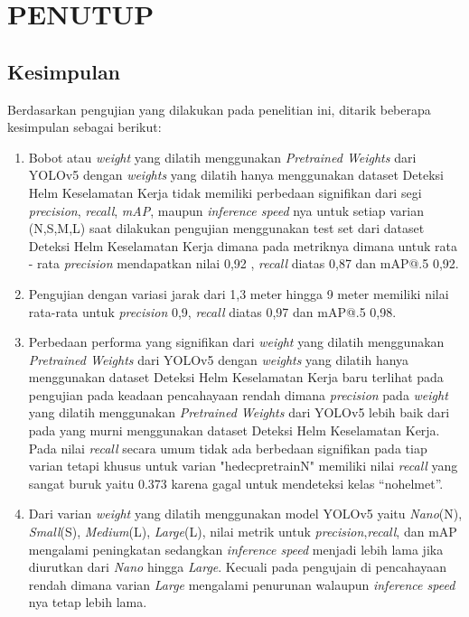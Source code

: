 \chapter{PENUTUP}
\label{chap:penutup}


\section{Kesimpulan}
\label{sec:kesimpulan}

\par Berdasarkan pengujian yang dilakukan pada penelitian ini, ditarik beberapa kesimpulan sebagai berikut:

\begin{enumerate}[nolistsep]
    \item Bobot atau \emph{weight} yang dilatih menggunakan \emph{Pretrained Weights} dari YOLOv5 dengan \emph{weights} yang dilatih hanya menggunakan dataset Deteksi Helm Keselamatan Kerja tidak memiliki perbedaan signifikan dari segi \emph{precision}, \emph{recall}, \emph{mAP}, maupun \emph{inference speed} nya untuk setiap varian (N,S,M,L) saat dilakukan pengujian menggunakan test set dari dataset Deteksi Helm Keselamatan Kerja dimana pada metriknya dimana untuk rata - rata \emph{precision} mendapatkan nilai 0,92 ,  \emph{recall} diatas 0,87 dan mAP@.5 0,92.
    \item Pengujian dengan variasi jarak dari 1,3 meter hingga 9 meter memiliki nilai rata-rata untuk \emph{precision} 0,9, \emph{recall} diatas 0,97 dan mAP@.5 0,98.
    \item Perbedaan performa yang signifikan dari \emph{weight} yang dilatih menggunakan \emph{Pretrained Weights} dari YOLOv5 dengan \emph{weights} yang dilatih hanya menggunakan dataset Deteksi Helm Keselamatan Kerja baru terlihat pada pengujian pada keadaan pencahayaan rendah dimana \emph{precision} pada \emph{weight} yang dilatih menggunakan \emph{Pretrained Weights} dari YOLOv5 lebih baik dari pada yang murni menggunakan dataset Deteksi Helm Keselamatan Kerja. Pada nilai \emph{recall} secara umum tidak ada berbedaan signifikan pada tiap varian tetapi khusus untuk varian "hedec\textunderscore pretrain\textunderscore N" memiliki nilai \emph{recall} yang sangat buruk yaitu 0.373 karena gagal untuk mendeteksi kelas “no\textunderscore helmet”.
    \item Dari varian \emph{weight} yang dilatih menggunakan model YOLOv5 yaitu \emph{Nano}(N), \emph{Small}(S), \emph{Medium}(L), \emph{Large}(L), nilai metrik untuk \emph{precision},\emph{recall}, dan mAP mengalami peningkatan sedangkan \emph{inference speed} menjadi lebih lama jika diurutkan dari \emph{Nano} hingga \emph{Large}. Kecuali pada pengujain di pencahayaan rendah dimana varian \emph{Large} mengalami penurunan walaupun \emph{inference speed} nya tetap lebih lama.

\end{enumerate}
